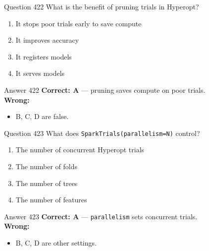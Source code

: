 \documentclass[aspectratio=169,11pt]{beamer}
\begin{document}
	\begin{frame}{Question 422}
		What is the benefit of pruning trials in Hyperopt?
		\begin{enumerate}[label=\Alph*.]
			\item It stops poor trials early to save compute
			\item It improves accuracy
			\item It registers models
			\item It serves models
		\end{enumerate}
	\end{frame}
	\begin{frame}{Answer 422}
		\textbf{Correct: A} --- pruning saves compute on poor trials.\\
		\vspace{0.5em}
		\textbf{Wrong:}
		\begin{itemize}
			\item B, C, D are false.
		\end{itemize}
	\end{frame}
	
	\begin{frame}{Question 423}
		What does \texttt{SparkTrials(parallelism=N)} control?
		\begin{enumerate}[label=\Alph*.]
			\item The number of concurrent Hyperopt trials
			\item The number of folds
			\item The number of trees
			\item The number of features
		\end{enumerate}
	\end{frame}
	\begin{frame}{Answer 423}
		\textbf{Correct: A} --- \texttt{parallelism} sets concurrent trials.\\
		\vspace{0.5em}
		\textbf{Wrong:}
		\begin{itemize}
			\item B, C, D are other settings.
		\end{itemize}
	\end{frame}
	
\end{document}
